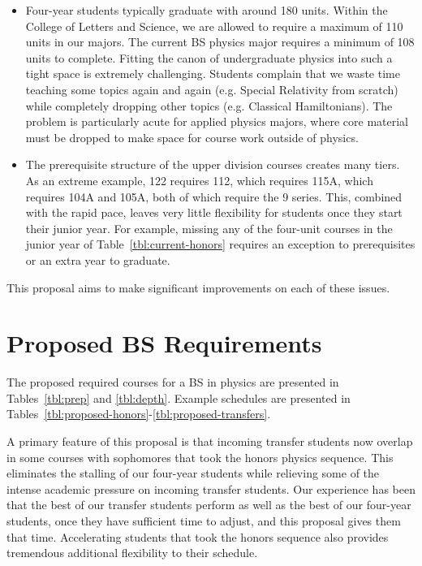 \documentclass[12pt]{article}
\begin{document}
\begin{itemize}
\item Four-year students typically graduate with around 180 units.
  Within the College of Letters and Science, we are allowed to require
  a maximum of 110 units in our majors.  The current BS physics major
  requires a minimum of 108 units to complete.  Fitting the canon of
  undergraduate physics into such a tight space is extremely
  challenging.  Students complain that we waste time teaching some
  topics again and again (e.g. Special Relativity from scratch) while
  completely dropping other topics (e.g. Classical Hamiltonians).  The
  problem is particularly acute for applied physics majors, where core
  material must be dropped to make space for course work outside of
  physics.

\item The prerequisite structure of the upper division courses creates
  many tiers.  As an extreme example, 122 requires 112, which requires
  115A, which requires 104A and 105A, both of which require the 9
  series.  This, combined with the rapid pace, leaves very little
  flexibility for students once they start their junior year.  For
  example, missing any of the four-unit courses in the junior year of
  Table~\ref{tbl:current-honors} requires an exception to
  prerequisites or an extra year to graduate.
\end{itemize}
This proposal aims to make significant improvements on each of these issues.

\newpage

\section{Proposed BS Requirements}

The proposed required courses for a BS in physics are presented in
Tables~\ref{tbl:prep} and \ref{tbl:depth}.  Example schedules are
presented in
Tables~\ref{tbl:proposed-honors}-\ref{tbl:proposed-transfers}.

A primary feature of this proposal is that incoming transfer students
now overlap in some courses with sophomores that took the honors
physics sequence.  This eliminates the stalling of our four-year
students while relieving some of the intense academic pressure on
incoming transfer students.  Our experience has been that the best of
our transfer students perform as well as the best of our four-year
students, once they have sufficient time to adjust, and this proposal
gives them that time.  Accelerating students that took the honors
sequence also provides tremendous additional flexibility to their
schedule.
\end{document}
